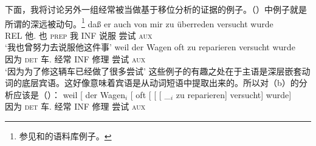 下面，我将讨论另外一组经常被当做基于移位分析的证据的例子。（）中例子就是所谓的深远被动句\citep[--176]{Hoehle78a}。\footnote{
参见和的语料库例子。
}
\eal
\ex{}
\gll daß er auch von mir zu überreden versucht wurde\footnotemark\\
     REL 他.\nom{} 也 \textsc{prep} 我 INF 说服 尝试 \textsc{aux}\\
\glt `我也曾努力去说服他这件事'
\ex 
\gll weil    der Wagen oft zu reparieren versucht wurde\\
     因为 \textsc{det} 车.\nom{}   经常 INF 修理   尝试  \textsc{aux}\\
\glt `因为为了修这辆车已经做了很多尝试'\label{bsp-zu-reparieren-versucht-wurde}
\zl
这些例子的有趣之处在于主语是深层嵌套动词的底层宾语。这好像意味着宾语是从动词短语中提取出来的。所以对（b）的分析应该是（）：
\ea
\gll weil    [ der Wagen$_i$ [ oft   [ [ [ \_$_i$ zu reparieren] versucht] wurde]\\
     因为 {}        \textsc{det} 车.\nom{} {}        经常 {}        {}        {}        {}    INF 修理       尝试     \textsc{aux}\\
